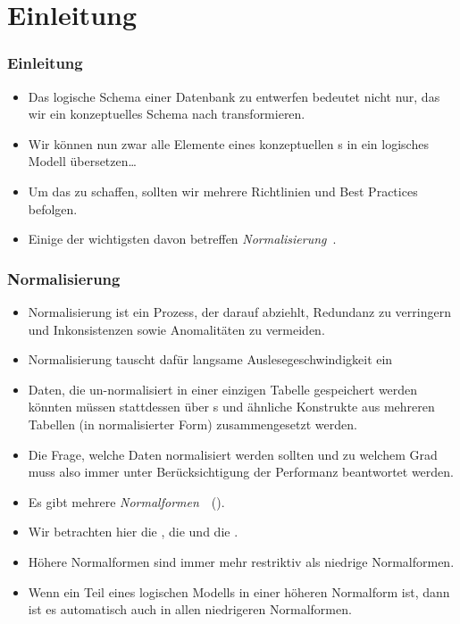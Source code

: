 \documentclass[aspectratio=169,mathserif,notheorems]{beamer}%
\subtitle{41.~Logisches Schema:~1.~Normalform}%
\begin{document}
%
%
\startPresentation%
%
\section{Einleitung}%
%
\begin{frame}%
\frametitle{Einleitung}%
\begin{itemize}%
%
\item Das logische Schema einer Datenbank zu entwerfen bedeutet nicht nur, das wir ein konzeptuelles Schema nach  transformieren.%
%
\item<2-> Wir können nun zwar alle Elemente eines konzeptuellen s in ein logisches Modell übersetzen\dots{}%
%
\item<4-> Um das zu schaffen, sollten wir mehrere Richtlinien und Best Practices befolgen.%
%
\item<5-> Einige der wichtigsten davon betreffen \emph{Normalisierung}~\cite{D2003AITDS,EN2015FODS}.%
%
\end{itemize}%
\end{frame}%
%
\begin{frame}%
\frametitle{Normalisierung}%
\begin{itemize}%
\item Normalisierung ist ein Prozess, der darauf abziehlt, Redundanz zu verringern und Inkonsistenzen sowie Anomalitäten zu vermeiden\cite{S2024D:N,S2024D:RNDAFDNF}.%
%
\item<2-> Normalisierung tauscht dafür langsame Auslesegeschwindigkeit ein%
%
\item<3-> Daten, die un-normalisiert in einer einzigen Tabelle gespeichert werden könnten müssen stattdessen über s und ähnliche Konstrukte aus mehreren Tabellen (in normalisierter Form) zusammengesetzt werden\cite{K1983ASGTFNFIRDT}.%
%
\item<4-> Die Frage, welche Daten normalisiert werden sollten und zu welchem Grad muss also immer unter Berücksichtigung der Performanz beantwortet werden\cite{K1983ASGTFNFIRDT}.%
%
\item<5-> Es gibt mehrere \emph{Normalformen}~~().%
%
\item<6-> Wir betrachten hier die , die  und die .%
%
\item<7-> Höhere Normalformen sind immer mehr restriktiv als niedrige Normalformen.%
%
\item<8-> Wenn ein Teil eines logischen Modells in einer höheren Normalform ist, dann ist es automatisch auch in allen niedrigeren Normalformen.%
\end{itemize}%
%
\end{frame}%
%
\end{document}
